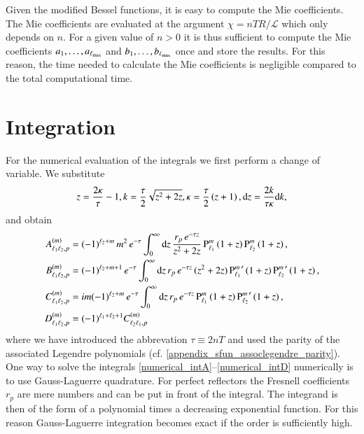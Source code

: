 Given the modified Bessel functions, it is easy to compute the Mie
coefficients. The Mie coefficients are evaluated at the argument $\chi =
nTR/\mathcal{L}$ which only depends on $n$. For a given value of $n>0$ it is
thus sufficient to compute the Mie coefficients $a_1, \dots, a_{\ell_\text{max}}$ and $b_1,
\dots, b_{\ell_\text{max}}$ once and store the results. For this reason, the time needed to
calculate the Mie coefficients is negligible compared to the total computational time.

\section{Integration}

For the numerical evaluation of the integrals we first perform a change of variable.
We substitute
\begin{equation}
z = \frac{2\kappa}{\tau}-1, \\ k = \frac{\tau}{2}\sqrt{z^2+2z}, \\ \kappa = \frac{\tau}{2} \left(z+1\right), \\ \mathrm{d}z = \frac{2k}{\tau\kappa} \mathrm{d}k,
\end{equation}
and obtain
\begin{align}
\label{numerical_intA}
A_{\ell_1\ell_2,p}^{(m)} &= (-1)^{\ell_2+m} \, m^2 \, e^{-\tau} \int_0^\infty \mathrm{d}z \, \frac{r_p \, e^{-\tau z}}{z^2+2z} \, {\text{P}_{\ell_1}^{m}}\left(1+z\right) {\text{P}_{\ell_2}^{m}}\left(1+z\right), \\
\label{numerical_intB}
B_{\ell_1\ell_2,p}^{(m)} &= (-1)^{\ell_2+m+1} \, e^{-\tau} \int_0^\infty \mathrm{d}z \, r_p \, e^{-\tau z} \, (z^2+2z) \, {\text{P}_{\ell_1}^{m}}^\prime\left(1+z\right) {\text{P}_{\ell_2}^{m}}^\prime\left(1+z\right), \\
\label{numerical_intC}
C_{\ell_1\ell_2,p}^{(m)} &= i m (-1)^{\ell_2+m} \, e^{-\tau} \int_0^\infty \mathrm{d}z \, r_p \, e^{-\tau z} \, {\text{P}_{\ell_1}^{m}}\left(1+z\right) {\text{P}_{\ell_2}^{m}}^\prime\left(1+z\right), \\
\label{numerical_intD}
D_{\ell_1\ell_2,p}^{(m)} &= (-1)^{\ell_1+\ell_2+1} C_{\ell_2\ell_1,p}^{(m)}
\end{align}
where we have introduced the abbrevation $\tau \equiv 2nT$ and used the parity
of the associated Legendre polynomials (cf.
\eqref{appendix_sfun_assoclegendre_parity}).
One way to solve the integrals \eqref{numerical_intA}--\eqref{numerical_intD} numerically is to use Gauss-Laguerre quadrature.
For perfect reflectors the Fresnell coefficients $r_p$ are mere numbers and can be put in front of the integral. The integrand
is then of the form of a polynomial times a decreasing exponential function. For this reason Gauss-Laguerre integration becomes
exact if the order is sufficiently high.

